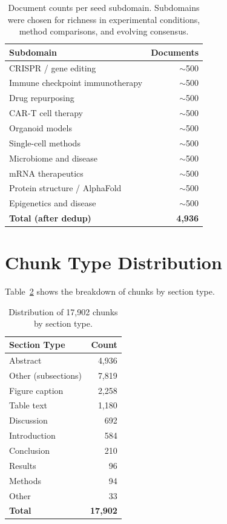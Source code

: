 \documentclass{article}
\begin{document}
\begin{table}[ht]
\centering
\caption{Document counts per seed subdomain. Subdomains were chosen for richness in experimental conditions, method comparisons, and evolving consensus.}
\small
\begin{tabular}{lr}
\toprule
\textbf{Subdomain} & \textbf{Documents} \\
\midrule
CRISPR / gene editing & ${\sim}$500 \\
Immune checkpoint immunotherapy & ${\sim}$500 \\
Drug repurposing & ${\sim}$500 \\
CAR-T cell therapy & ${\sim}$500 \\
Organoid models & ${\sim}$500 \\
Single-cell methods & ${\sim}$500 \\
Microbiome and disease & ${\sim}$500 \\
mRNA therapeutics & ${\sim}$500 \\
Protein structure / AlphaFold & ${\sim}$500 \\
Epigenetics and disease & ${\sim}$500 \\
\midrule
\textbf{Total (after dedup)} & \textbf{4,936} \\
\bottomrule
\end{tabular}
\label{tab:subdomains}
\end{table}

\section{Chunk Type Distribution}
\label{app:chunks}

Table~\ref{tab:chunks} shows the breakdown of chunks by section type.

\begin{table}[ht]
\centering
\caption{Distribution of 17,902 chunks by section type.}
\small
\begin{tabular}{lr}
\toprule
\textbf{Section Type} & \textbf{Count} \\
\midrule
Abstract & 4,936 \\
Other (subsections) & 7,819 \\
Figure caption & 2,258 \\
Table text & 1,180 \\
Discussion & 692 \\
Introduction & 584 \\
Conclusion & 210 \\
Results & 96 \\
Methods & 94 \\
Other & 33 \\
\midrule
\textbf{Total} & \textbf{17,902} \\
\bottomrule
\end{tabular}
\label{tab:chunks}
\end{table}
\end{document}

